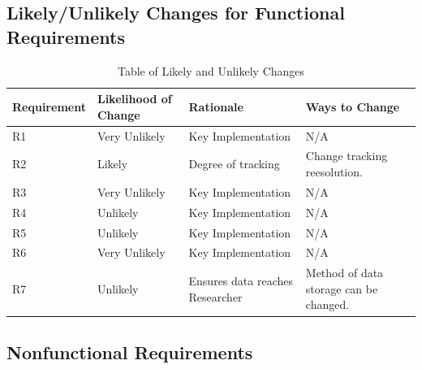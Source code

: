 \documentclass[12pt]{article}
\begin{document}
\subsection{Likely/Unlikely Changes for Functional Requirements}    
\begin{table}[H]
	\begin{tabularx}{1.05\textwidth} { 
		  | >{\centering\arraybackslash}X 
		  | >{\centering\arraybackslash}X 
		  | >{\centering\arraybackslash}X 
		  | >{\centering\arraybackslash}X | }
		 \hline
		 Requirement & Likelihood of Change& Rationale & Ways to Change \\
		 \hline
		 R1  & Very Unlikely  & Key Implementation & N/A  \\
		 \hline
		 R2  & Likely  &Degree of tracking& Change tracking reesolution.  \\
		 \hline
		 R3  & Very Unlikely  & Key Implementation & N/A  \\
		 \hline
		 R4  & Unlikely  & Key Implementation & N/A  \\
		\hline
		 R5  & Unlikely & Key Implementation &  N/A \\
		 \hline
		 R6  & Very Unlikely  & Key Implementation & N/A  \\
		\hline
		 R7  & Unlikely  & Ensures data reaches Researcher & Method of data storage can be changed.  \\
		\hline
	\end{tabularx}
\caption{\label{likChanges}Table of Likely and Unlikely Changes}  
\end{table}

\subsection{Nonfunctional Requirements}
\end{document}
